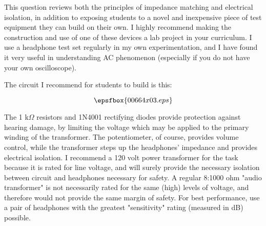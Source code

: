





This question reviews both the principles of impedance matching and electrical isolation, in addition to exposing students to a novel and inexpensive piece of test equipment they can build on their own.  I highly recommend making the construction and use of one of these devices a lab project in your curriculum.  I use a headphone test set regularly in my own experimentation, and I have found it very useful in understanding AC phenomenon (especially if you do not have your own oscilloscope).

\vskip 10pt

The circuit I recommend for students to build is this:

$$\epsfbox{00664x03.eps}$$

The 1 k$\Omega$ resistors and 1N4001 rectifying diodes provide protection against hearing damage, by limiting the voltage which may be applied to the primary winding of the transformer.  The potentiometer, of course, provides volume control, while the transformer steps up the headphones' impedance and provides electrical isolation.  I recommend a 120 volt power transformer for the task because it is rated for line voltage, and will surely provide the necessary isolation between circuit and headphones necessary for safety.  A regular 8:1000 ohm "audio transformer" is not necessarily rated for the same (high) levels of voltage, and therefore would not provide the same margin of safety.  For best performance, use a pair of headphones with the greatest "sensitivity" rating (measured in dB) possible.




